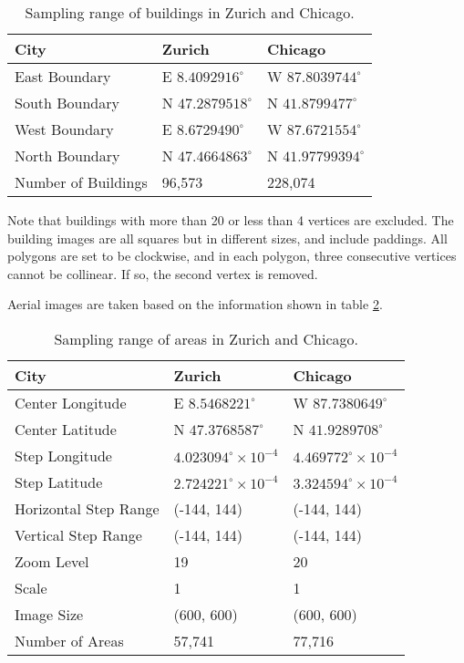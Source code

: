 \begin{table}[!h]
	\centering
	\caption[Sampling range of buildings in Zurich and Chicago]{Sampling range of buildings in Zurich and Chicago.}
	\label{tab:bldrange}
	\begin{tabular}{l|l|l}
	\hline
	City & Zurich & Chicago \\ \hline
	East Boundary & E $8.4092916^\circ$ & W $87.8039744^\circ$ \\
	South Boundary & N $47.2879518^\circ$ & N $41.8799477^\circ$ \\
	West Boundary & E $8.6729490^\circ$ & W $87.6721554^\circ$ \\
	North Boundary & N $47.4664863^\circ$ & N $41.97799394^\circ$ \\
	\hline
	Number of Buildings & 96,573 & 228,074 \\
	\hline
	\end{tabular}
\end{table}

Note that buildings with more than 20 or less than 4 vertices are excluded. The building images are all squares but in different sizes, and include paddings. All polygons are set to be clockwise, and in each polygon, three consecutive vertices cannot be collinear. If so, the second vertex is removed.

Aerial images are taken based on the information shown in table \ref{tab:arerange}.

\begin{table}[!h]
	\centering
	\caption[Sampling range of areas in Zurich and Chicago]{Sampling range of areas in Zurich and Chicago.}
	\label{tab:arerange}
	\begin{tabular}{l|l|l}
	\hline
	City & Zurich & Chicago \\ \hline
	Center Longitude & E $8.5468221^\circ$ & W $87.7380649^\circ$ \\
	Center Latitude & N $47.3768587^\circ$ & N $41.9289708^\circ$ \\
	Step Longitude & $4.023094^\circ\times10^{-4}$ & $4.469772^\circ\times10^{-4}$ \\
	Step Latitude & $2.724221^\circ\times10^{-4}$ & $3.324594^\circ\times10^{-4}$ \\
	Horizontal Step Range & (-144, 144) & (-144, 144) \\
	Vertical Step Range & (-144, 144) & (-144, 144) \\
	Zoom Level & 19 & 20 \\
	Scale & 1 & 1 \\
	Image Size & (600, 600) & (600, 600) \\
	\hline
	Number of Areas & 57,741 & 77,716 \\
	\hline
	\end{tabular}
\end{table}

